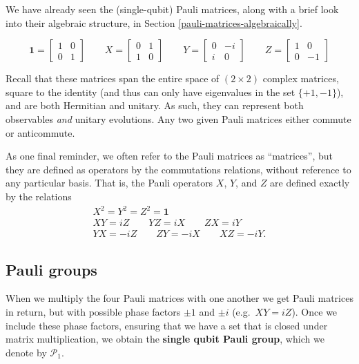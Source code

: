 \documentclass[fleqn]{article}
\begin{document}
We have already seen the (single-qubit) Pauli matrices, along with a brief look into their algebraic structure, in Section \ref{pauli-matrices-algebraically}.

\[
  \mathbf{1}= \begin{bmatrix}1&0\\0&1\end{bmatrix}
  \qquad
  X = \begin{bmatrix}0&1\\1&0\end{bmatrix}
  \qquad
  Y = \begin{bmatrix}0&-i\\i&0\end{bmatrix}
  \qquad
  Z = \begin{bmatrix}1&0\\0&-1\end{bmatrix}
\]

Recall that these matrices span the entire space of \((2\times2)\) complex matrices, square to the identity (and thus can only have eigenvalues in the set \(\{+1,-1\}\)), and are both Hermitian and unitary.
As such, they can represent both observables \emph{and} unitary evolutions.
Any two given Pauli matrices either commute or anticommute.

As one final reminder, we often refer to the Pauli matrices as ``matrices'', but they are defined as operators by the commutations relations, without reference to any particular basis.
That is, the Pauli operators \(X\), \(Y\), and \(Z\) are defined exactly by the relations
\[
  \begin{gathered}
    X^2 = Y^2 = Z^2 = \mathbf{1}
  \\XY=iZ \qquad YZ=iX \qquad ZX=iY
  \\YX=-iZ \qquad ZY=-iX \qquad XZ=-iY.
  \end{gathered}
\]

\hypertarget{pauli-groups}{%
\subsection{Pauli groups}\label{pauli-groups}}

When we multiply the four Pauli matrices with one another we get Pauli matrices in return, but with possible phase factors \(\pm1\) and \(\pm i\) (e.g.~\(XY=iZ\)).
Once we include these phase factors, ensuring that we have a set that is closed under matrix multiplication, we obtain the \textbf{single qubit Pauli group}, which we denote by \(\mathcal{P}_1\).
\end{document}
